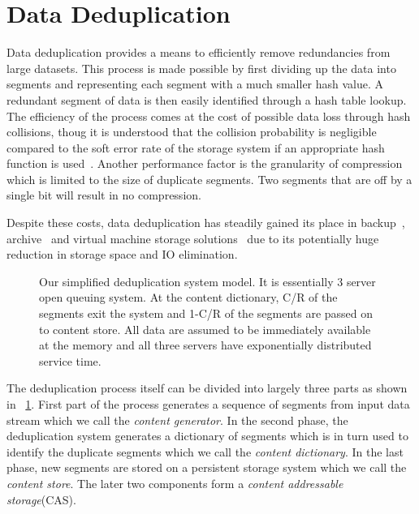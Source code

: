 \section{Data Deduplication}
\label{DD}

Data deduplication provides a means to efficiently remove redundancies from large datasets.
This process is made possible by first dividing up the data into segments and representing each segment with a much smaller hash value.
A redundant segment of data is then easily identified through a hash table lookup.
The efficiency of the process comes at the cost of possible data loss through hash collisions, thoug it is understood that the collision probability is negligible compared to the soft error rate of the storage system if an appropriate hash function is used~\cite{aronovich:2009, zhu:2008, bobbarjung:2006, muthitacharoen:2001}.
Another performance factor is the granularity of compression which is limited to the size of duplicate segments.
Two segments that are off by a single bit will result in no compression.

Despite these costs, data deduplication has steadily gained its place in backup~\cite{meister:2009, lillibridge:2009, zhu:2008}, archive~\cite{you:2005} and virtual machine storage solutions~\cite{smith:2008, jin:2009, clements:2009} due to its potentially huge reduction in storage space and IO elimination.

\begin{figure}[!t]
\centering

\captionsetup{format=myformat}
\caption{Our simplified deduplication system model. It is essentially 3 server open queuing system. At the content dictionary, C/R of the segments exit the system and 1-C/R of the segments are passed on to content store. All data are assumed to be immediately available at the memory and all three servers have exponentially distributed service time.}
\label{fig:queue}
\end{figure}

The deduplication process itself can be divided into largely three parts as shown in \figurename~\ref{fig:queue}. First part of the process generates a sequence of segments from input data stream which we call the \emph{content generator}. In the second phase, the deduplication system generates a dictionary of segments which is in turn used to identify the duplicate segments which we call the \emph{content dictionary}. In the last phase, new segments are stored on a persistent storage system which we call the \emph{content store}. The later two components form a \emph{content addressable storage}(CAS).

